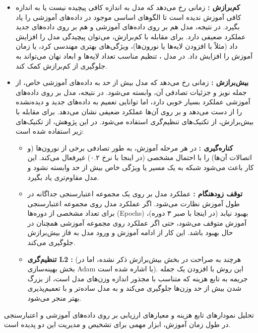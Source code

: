 \begin{itemize}
    \item \textbf{کم‌برازش :} زمانی رخ می‌دهد که مدل به اندازه کافی پیچیده نیست یا به اندازه کافی آموزش ندیده است تا الگوهای اساسی موجود در داده‌های آموزشی را یاد بگیرد. در نتیجه، مدل هم بر روی داده‌های آموزشی و هم بر روی داده‌های جدید عملکرد ضعیفی دارد. برای مقابله با کم‌برازش، می‌توان پیچیدگی مدل را افزایش داد (مثلاً با افزودن لایه‌ها یا نورون‌ها)، ویژگی‌های بهتری مهندسی کرد، یا زمان آموزش را افزایش داد. در مدل ، تنظیم مناسب تعداد لایه‌ها  و ابعاد نهان  می‌تواند به جلوگیری از کم‌برازش کمک کند.
    \item \textbf{بیش‌برازش :} زمانی رخ می‌دهد که مدل بیش از حد به داده‌های آموزشی خاص، از جمله نویز و جزئیات تصادفی آن، وابسته می‌شود. در نتیجه، مدل بر روی داده‌های آموزشی عملکرد بسیار خوبی دارد، اما توانایی تعمیم به داده‌های جدید و دیده‌نشده را از دست می‌دهد و بر روی آن‌ها عملکرد ضعیفی نشان می‌دهد. برای مقابله با بیش‌برازش، از تکنیک‌های تنظیم‌گری  استفاده می‌شود. در این پژوهش، از تکنیک‌های زیر استفاده شده است:
    \begin{itemize}
        \item \textbf{کناره‌گیری :} در هر مرحله آموزش، به طور تصادفی برخی از نورون‌ها (و اتصالات آن‌ها) را با احتمال مشخصی (در اینجا با نرخ ۰.۲) غیرفعال می‌کند. این کار باعث می‌شود شبکه به یک مسیر یا ویژگی خاص بیش از حد وابسته نشود و مدل مقاوم‌تری یاد بگیرد.
        \item \textbf{توقف زودهنگام :} عملکرد مدل بر روی یک مجموعه اعتبارسنجی جداگانه در طول آموزش نظارت می‌شود. اگر عملکرد مدل روی مجموعه اعتبارسنجی برای تعداد مشخصی از دوره‌ها (Epochs) بهبود نیابد (در اینجا با صبر ۳ دوره)، آموزش متوقف می‌شود، حتی اگر عملکرد روی مجموعه آموزشی همچنان در حال بهبود باشد. این کار از ادامه آموزش و ورود مدل به فاز بیش‌برازش جلوگیری می‌کند.
        \item \textbf{تنظیم‌گری L2 :} (هرچند به صراحت در بخش بیش‌برازش ذکر نشده، اما در بخش بهینه‌سازی Adam با  اشاره شده است). این روش با افزودن یک جمله جریمه به تابع هزینه که متناسب با مجذور اندازه وزن‌های مدل است، از بزرگ شدن بیش از حد وزن‌ها جلوگیری می‌کند و به مدل ساده‌تر و با تعمیم‌پذیری بهتر منجر می‌شود.
    \end{itemize}
\end{itemize}
تحلیل نمودارهای تابع هزینه و معیارهای ارزیابی بر روی داده‌های آموزشی و اعتبارسنجی در طول زمان آموزش، ابزار مهمی برای تشخیص و مدیریت این دو پدیده است.

